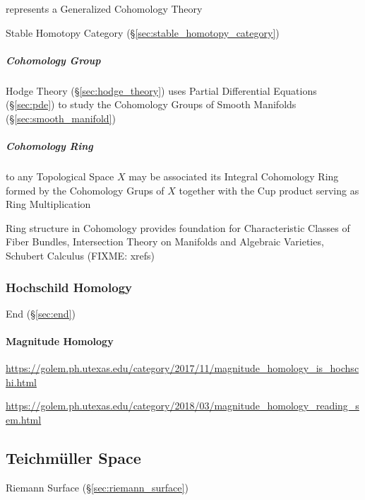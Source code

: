 represents a Generalized Cohomology Theory

Stable Homotopy Category (\S\ref{sec:stable_homotopy_category})



\subparagraph{Cohomology Group}\label{sec:cohomology_group}\hfill

\fist Hodge Theory (\S\ref{sec:hodge_theory}) uses Partial Differential
Equations (\S\ref{sec:pde}) to study the Cohomology Groups of Smooth Manifolds
(\S\ref{sec:smooth_manifold})



\subparagraph{Cohomology Ring}\label{sec:cohomology_rin}\hfill

to any Topological Space $X$ may be associated its Integral Cohomology Ring
formed by the Cohomology Grups of $X$ together with the Cup product serving as
Ring Multiplication

Ring structure in Cohomology provides foundation for Characteristic Classes of
Fiber Bundles, Intersection Theory on Manifolds and Algebraic Varieties,
Schubert Calculus (FIXME: xrefs)



\subsubsection{Hochschild Homology}\label{sec:hochschild_homology}

End (\S\ref{sec:end})



\paragraph{Magnitude Homology}\label{sec:magnitude_homology}\hfill

\url{https://golem.ph.utexas.edu/category/2017/11/magnitude_homology_is_hochschi.html}

\url{https://golem.ph.utexas.edu/category/2018/03/magnitude_homology_reading_sem.html}



\subsection{Teichm\"uller Space}\label{sec:teichmuller_space}

Riemann Surface (\S\ref{sec:riemann_surface})

